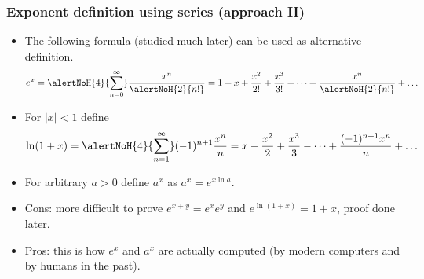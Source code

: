 \begin{frame}
\frametitle{Exponent definition using series (approach II)}
\begin{itemize}
\item<1-> The following formula (studied much later) can be used as alternative definition.
\[
e^{x}=\alertNoH{4}{\sum_{n=0}^{\infty}} \frac{x^n}{\alertNoH{2}{n!}}= 1+ x+\frac{x^2}{2!}+\frac{x^3}{3!}+\dots + \frac{x^{n}}{\alertNoH{2}{n!}}+\dots
\]
\item<3-> For $|x|<1$ define 
\[
\ln (1+x)=\alertNoH{4}{\sum_{n=1}^{\infty}} (-1)^{n+1}\frac{x^n}{n}=  x-\frac{x^2}{2}+\frac{x^3}{3}-\dots + \frac{(-1)^{n+1}x^{n}}{n}+\dots
\]
\item<5-> For arbitrary $a>0$ define $a^x$ as $a^x=e^{x\ln a}$. 
\item<6-> Cons: more difficult to prove $e^{x+y}= e^{x} e^y$ and $e^{\ln(1+x)}=1+x$, proof done later.
\item<7-> Pros: this is how $e^x$ and $a^x$ are actually computed (by modern computers and by humans in the past).
\end{itemize}
\end{frame}

